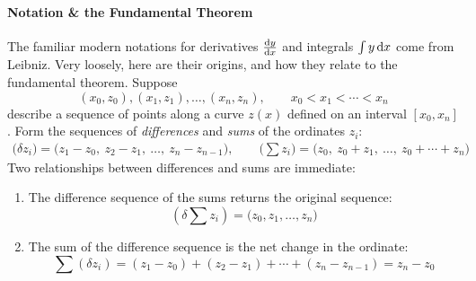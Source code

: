 \paragraph{Notation \& the Fundamental Theorem}

The familiar modern notations for derivatives $\diff[y]{x}$ and integrals $\int y\,\dx$ come from Leibniz. Very loosely, here are their origins, and how they relate to the fundamental theorem. Suppose
\[
	(x_0,z_0),(x_1,z_1),\ldots,(x_n,z_n),\qquad x_0<x_1<\cdots<x_n
\]
describe a sequence of points along a curve $z(x)$ defined on an interval $[x_0,x_n]$. Form the sequences of \emph{differences} and \emph{sums} of the ordinates $z_i$:
\begin{gather*}
	\big(\delta z_i\big) =\big(z_1-z_0,\ z_2-z_1,\ \ldots,\ z_n-z_{n-1}\big),\qquad
	\big(\sum z_i\big) =\big(z_0,\ z_0+z_1,\ \ldots,\ z_0+\cdots+z_n\big)
\end{gather*}
Two relationships between differences and sums are immediate:
\begin{enumerate}
	\item The difference sequence of the sums returns the original sequence:
	\[
		\left(\delta\sum z_i\right)=\big(z_0,z_1,\ldots,z_n\big)
	\]
	\item The sum of the difference sequence is the net change in the ordinate:
	\[
		\sum\left(\delta z_i\right)=(z_1-z_0)+(z_2-z_1)+\cdots +(z_n-z_{n-1}) =z_n-z_0
	\]
\end{enumerate}

